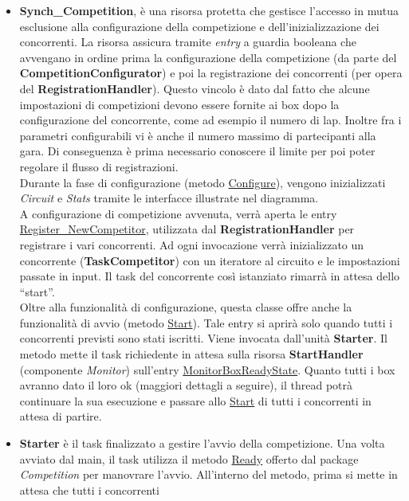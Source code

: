 \begin{itemize}
\item \textbf{Synch\_Competition}, \`{e} una risorsa protetta che gestisce l'accesso in mutua esclusione alla configurazione della competizione
e dell'inizializzazione dei concorrenti. La risorsa assicura tramite \emph{entry} a guardia booleana
che avvengano in ordine prima la configurazione
della competizione (da parte del \textbf{CompetitionConfigurator}) e poi la registrazione dei concorrenti (per opera del \textbf{RegistrationHandler}).
Questo vincolo \`{e} dato dal fatto che alcune impostazioni di competizioni devono essere fornite ai box dopo la configurazione del concorrente, 
come ad esempio il numero di lap. Inoltre fra i parametri configurabili vi \`{e} anche il numero massimo di partecipanti alla gara. Di conseguenza
\`{e} prima necessario conoscere il limite per poi poter regolare il flusso di registrazioni.\\
Durante la fase di configurazione (metodo \underline{Configure}), vengono inizializzati \emph{Circuit} e \emph{Stats} tramite le interfacce
illustrate nel diagramma.\\
A configurazione di competizione avvenuta, verr\`{a} aperta le entry\\ \underline{Register\_NewCompetitor}, utilizzata dal \textbf{RegistrationHandler}
per registrare i vari concorrenti. Ad ogni invocazione verr\`{a} inizializzato un concorrente (\textbf{TaskCompetitor}) con un iteratore al circuito
e le impostazioni passate in input. Il task del concorrente cos\`{i} istanziato rimarr\`{a} in attesa dello ``start''.\\
Oltre alla funzionalit\`{a} di configurazione, questa classe offre anche la funzionalit\`{a} di avvio (metodo \underline{Start}).
Tale entry si aprir\`{a} solo quando tutti i concorrenti previsti sono stati iscritti. Viene invocata dall'unit\`{a} \textbf{Starter}.
Il metodo mette il task richiedente in attesa sulla risorsa \textbf{StartHandler} (componente \emph{Monitor}) sull'entry \underline{MonitorBoxReadyState}.
Quanto tutti i box avranno dato il loro ok (maggiori dettagli a seguire), il thread potr\`{a} continuare la sua esecuzione e passare allo \underline{Start}
di tutti i concorrenti in attesa di partire.
\item \textbf{Starter} \`{e} il task finalizzato a gestire l'avvio della competizione. Una volta avviato dal main, il task utilizza il metodo \underline{Ready}
offerto dal package \emph{Competition} per manovrare l'avvio. All'interno del metodo, prima si mette in attesa che tutti i concorrenti

\end{itemize}
